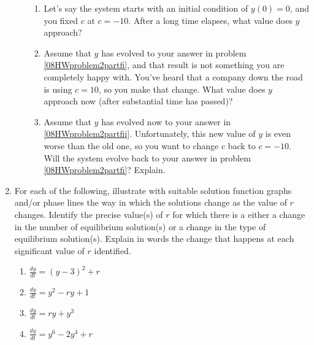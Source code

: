 \begin{enumerate}
\begin{enumerate}
\begin{enumerate}
\item Let's say the system starts with an initial condition of $y(0) = 0$, and you fixed $c$ at $c = -10$. After a long time elapses, what value does $y$ approach? \label{08HWproblem2partfi}
\item Assume that $y$ has evolved to your answer in problem \ref{08HWproblem2partfi}, and that result is not something you are completely happy with. You've heard that a company down the road is using $c = 10$, so you make that change. What value does $y$ approach now (after substantial time has passed)? \label{08HWproblem2partfii}
\item Assume that $y$ has evolved now to your answer in \ref{08HWproblem2partfii}. Unfortunately, this new value of $y$ is even worse than the old one, so you want to change $c$ back to $c = -10$. Will the system evolve back to your answer in problem \ref{08HWproblem2partfi}? Explain. \label{08HWproblem2partfiii}
\end{enumerate}
\end{enumerate}

\item For each of the following, illustrate with suitable solution function graphs and/or phase lines the way in which the solutions change as the value of $r$ changes. Identify the precise value(s) of $r$ for which there is a either a change in the number of equilibrium solution(s) or a change in the type of equilibrium solution(s). Explain in words the change that happens at each significant value of $r$ identified. 

\begin{enumerate}
\item $\displaystyle \frac{dy}{dt}=(y-3)^2+r$ \label{08HWproblem3parta}
\item $\displaystyle \frac{dy}{dt}=y^2-ry+1$ \label{08HWproblem3partb}
\item $\displaystyle \frac{dy}{dt}=ry+y^3$ \label{08HWproblem3partc}
\item $\displaystyle \frac{dy}{dt}=y^6-2y^4+r$ \label{08HWproblem3partd}
\end{enumerate}


\end{enumerate}
